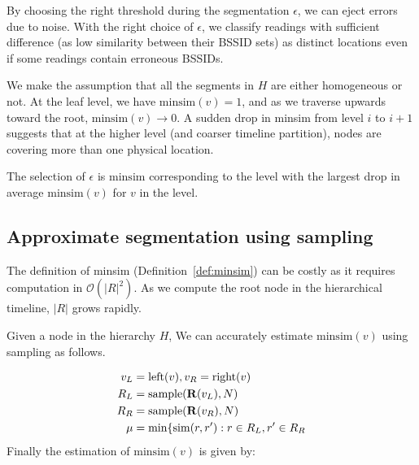 By choosing the right threshold during the segmentation $\epsilon$, we can eject
errors due to noise.  With the right choice of
$\epsilon$, we classify readings with sufficient difference (as low similarity
between their BSSID sets) as distinct locations even if some readings contain
erroneous BSSIDs.

We make the assumption that all the segments in $H$ are either homogeneous or
not.  At the leaf level, we have $\mathrm{minsim}(v) = 1$, and as we traverse
upwards toward the root, $\mathrm{minsim}(v)\to 0$.  A sudden drop in minsim
from level $i$ to $i+1$ suggests that at the higher level (and coarser timeline
partition), nodes are covering more than one physical location.

The selection of $\epsilon$ is $\mathrm{minsim}$ corresponding to the level with
the largest drop in average $\mathrm{minsim}(v)$ for $v$ in the level.

\subsection{Approximate segmentation using sampling}

The definition of minsim (Definition~\ref{def:minsim}) can be costly as it
requires computation in $\mathcal{O}(|R|^2)$.  As we compute the root node in
the hierarchical timeline, $|R|$ grows rapidly.

Given a node in the hierarchy $H$, We can accurately estimate
$\mathrm{minsim}(v)$ using sampling as follows.

\begin{align*}
v_L &= \mathrm{left}(v), v_R = \mathrm{right}(v)\\
R_L &= \mathrm{sample}(\mathbf{R}(v_L), N)\\
R_R &= \mathrm{sample}(\mathbf{R}(v_R), N)\\
\mu &= \mathrm{min}\{\mathrm{sim}(r,r'): r\in R_L, r'\in R_R
\end{align*}
Finally the estimation of $\mathrm{minsim}(v)$ is given by:

